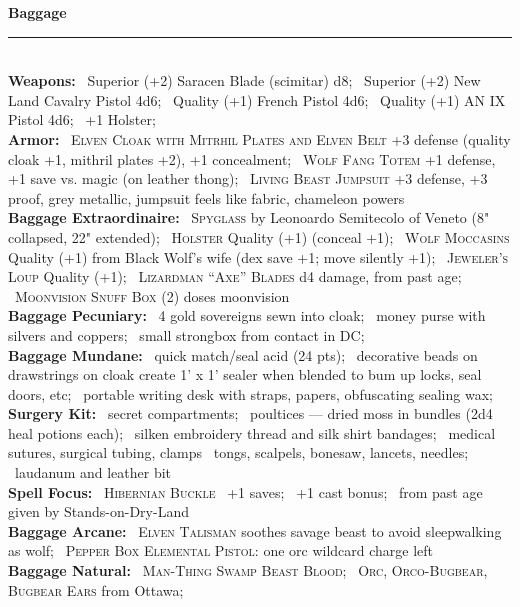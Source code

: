 \documentclass[11pt]{article}
\newcommand{\heading}[1]{{\sc\bfseries #1}}
\begin{document}
\clearpage
\noindent
{\sc\bfseries\Large Baggage}
\vspace*{4pt}
\hrule
\mbox{ }
\\[4pt]
%
\heading{Weapons:}
\ Superior (+2) Saracen Blade (scimitar) d8;
\ Superior (+2) New Land Cavalry Pistol 4d6;
\ Quality (+1) French Pistol 4d6;
\ Quality (+1) AN IX Pistol 4d6;
\ +1 Holster;
%
\\[6pt]
%
\heading{Armor:}
\ \textsc{Elven Cloak with Mitrhil Plates and Elven Belt} +3 defense (quality cloak
+1, mithril plates +2), +1 concealment;
\ \textsc{Wolf Fang Totem} +1 defense, +1 save vs. magic (on leather thong);
\ \textsc{Living Beast Jumpsuit} +3 defense, +3 proof, grey metallic,
jumpsuit feels like fabric, chameleon powers
%
\\[6pt]
%
\heading{Baggage Extraordinaire:}
\ \textsc{Spyglass} by Leonoardo Semitecolo of Veneto (8" collapsed, 22" extended);
\ \textsc{Holster} Quality (+1) (conceal +1);
\ \textsc{Wolf Moccasins} Quality (+1) from Black Wolf's wife (dex
save +1; move silently +1);
\ \textsc{Jeweler's Loup} Quality (+1);
\ \textsc{Lizardman ``Axe'' Blades} d4 damage, from past age;
\ \textsc{Moonvision Snuff Box} (2) doses moonvision
%
\\[6pt]
%
\heading{Baggage Pecuniary:}
\ 4 gold sovereigns sewn into cloak;
\ money purse with silvers and coppers;
\ small strongbox from contact in DC;
%
\\[6pt]
%
\heading{Baggage Mundane:}
\ quick match/seal acid (24 pts);
\ decorative beads on drawstrings on cloak create 1' x 1' sealer when
blended to bum up locks, seal doors, etc;
\ portable writing desk with straps, papers, obfuscating sealing wax;
%
\\[6pt]
%
\heading{Surgery Kit:}
\ secret compartments;
\ poultices --- dried moss in bundles (2d4 heal potions each);
\ silken embroidery thread and silk shirt bandages;
\ medical sutures, surgical tubing, clamps
\ tongs, scalpels, bonesaw, lancets, needles;
\ laudanum and leather bit
%
\\[6pt]
%
\heading{Spell Focus:}
\ \textsc{Hibernian Buckle}
\ +1 saves;
\ +1 cast bonus;
\ from past age given by Stands-on-Dry-Land
%
\\[6pt]
%
\heading{Baggage Arcane:}
\ \textsc{Elven Talisman} soothes savage beast to avoid sleepwalking
as wolf;
\ \textsc{Pepper Box Elemental Pistol:} one orc wildcard charge left
%
\\[6pt]
%
\heading{Baggage Natural:}
\ \textsc{Man-Thing Swamp Beast Blood};
\ \textsc{Orc, Orco-Bugbear, Bugbear Ears} from Ottawa;
\end{document}
